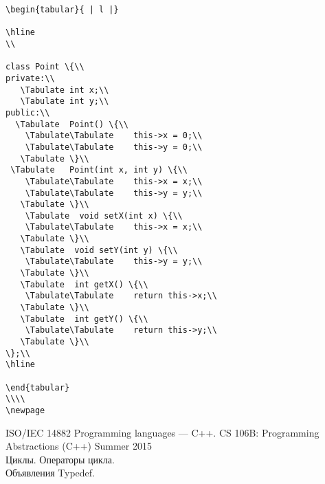 \documentclass{article}
\begin{document}
\begin{lstlisting}
\begin{tabular}{ | l |}

\hline
\\

class Point \{\\
private:\\
   \Tabulate int x;\\
   \Tabulate int y;\\
public:\\
  \Tabulate  Point() \{\\
    \Tabulate\Tabulate    this->x = 0;\\
    \Tabulate\Tabulate    this->y = 0;\\
   \Tabulate \}\\
 \Tabulate   Point(int x, int y) \{\\
    \Tabulate\Tabulate    this->x = x;\\
    \Tabulate\Tabulate    this->y = y;\\
   \Tabulate \}\\
    \Tabulate  void setX(int x) \{\\
    \Tabulate\Tabulate    this->x = x;\\
   \Tabulate \}\\
   \Tabulate  void setY(int y) \{\\
    \Tabulate\Tabulate    this->y = y;\\
   \Tabulate \}\\
   \Tabulate  int getX() \{\\
    \Tabulate\Tabulate    return this->x;\\
   \Tabulate \}\\
   \Tabulate  int getY() \{\\
    \Tabulate\Tabulate    return this->y;\\
   \Tabulate \}\\
\};\\
\hline

\end{tabular}
\\\\
\newpage

\end{lstlisting}
\begin{thebibliography}{1}
ISO/IEC 14882 Programming languages — C++.
CS 106B: Programming Abstractions (C++)
Summer 2015 \\ [http://stanford.edu/class/archive/cs/cs106b/cs106b.1158/styleguide.shtml]
Циклы. Операторы цикла. \\
[https://www.bestprog.net/ru/2017/09/04/cycles-operators-of-the-cycle-for-while-do-while\_ru/]
Объявления Typedef.\\
[https://docs.microsoft.com/ru-ru/cpp/c-language/typedef-declarations?view=msvc-16]
\end{thebibliography}

\end{document}
